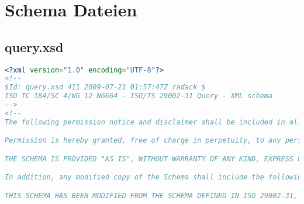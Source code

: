 
\chapter{Schema Dateien} \label{kap:anhang_schema}

\section{query.xsd}\label{sec:query_xsd}

 \begin{lstlisting}[caption=query.xsd, language=XML, label=lst:query_xsd]
<?xml version="1.0" encoding="UTF-8"?>
<!--
$Id: query.xsd 411 2009-07-21 01:57:47Z radack $
ISO TC 184/SC 4/WG 12 N6664 - ISO/TS 29002-31 Query - XML schema
-->
<!--
The following permission notice and disclaimer shall be included in all copies of this XML schema ("the Schema"), and derivations of the Schema:

Permission is hereby granted, free of charge in perpetuity, to any person obtaining a copy of the Schema, to use, copy, modify, merge and distribute free of charge, copies of the Schema for the purposes of developing, implementing, installing and using software based on the  Schema, and to permit persons to whom the Schema is furnished to do so, subject to the following conditions:

THE SCHEMA IS PROVIDED "AS IS", WITHOUT WARRANTY OF ANY KIND, EXPRESS OR IMPLIED, INCLUDING BUT NOT LIMITED TO THE WARRANTIES OF MERCHANTABILITY, FITNESS FOR A PARTICULAR PURPOSE AND NONINFRINGEMENT. IN NO EVENT SHALL THE AUTHORS OR COPYRIGHT HOLDERS BE LIABLE FOR ANY CLAIM, DAMAGES OR OTHER LIABILITY, WHETHER IN AN ACTION OF CONTRACT, TORT OR OTHERWISE, ARISING FROM, OUT OF OR IN CONNECTION WITH THE SCHEMA OR THE USE OR OTHER DEALINGS IN THE SCHEMA.

In addition, any modified copy of the Schema shall include the following notice:

THIS SCHEMA HAS BEEN MODIFIED FROM THE SCHEMA DEFINED IN ISO 29002-31, AND SHOULD NOT BE INTERPRETED AS COMPLYING WITH THAT STANDARD.


\end{lstlisting}
